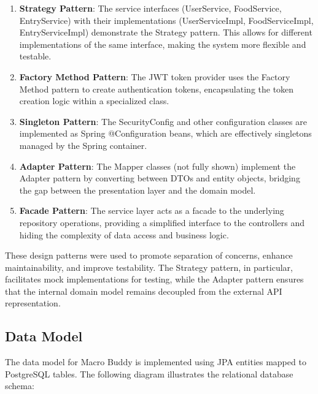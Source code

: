 \documentclass[a4paper,10pt]{article}
\begin{document}
            \begin{enumerate}
                \item \textbf{Strategy Pattern}: The service interfaces (UserService, FoodService, EntryService) with their implementations (UserServiceImpl, FoodServiceImpl, EntryServiceImpl) demonstrate the Strategy pattern. This allows for different implementations of the same interface, making the system more flexible and testable.

                \item \textbf{Factory Method Pattern}: The JWT token provider uses the Factory Method pattern to create authentication tokens, encapsulating the token creation logic within a specialized class.

                \item \textbf{Singleton Pattern}: The SecurityConfig and other configuration classes are implemented as Spring @Configuration beans, which are effectively singletons managed by the Spring container.

                \item \textbf{Adapter Pattern}: The Mapper classes (not fully shown) implement the Adapter pattern by converting between DTOs and entity objects, bridging the gap between the presentation layer and the domain model.

                \item \textbf{Facade Pattern}: The service layer acts as a facade to the underlying repository operations, providing a simplified interface to the controllers and hiding the complexity of data access and business logic.
            \end{enumerate}

            These design patterns were used to promote separation of concerns, enhance maintainability, and  improve testability. The Strategy pattern, in particular, facilitates mock implementations for testing, while the Adapter pattern ensures that the internal domain model remains decoupled from the external API representation.
            \newpage
        \subsection{Data Model}
            The data model for Macro Buddy is implemented using JPA entities mapped to PostgreSQL tables. The following diagram illustrates the relational database schema:
\end{document}
